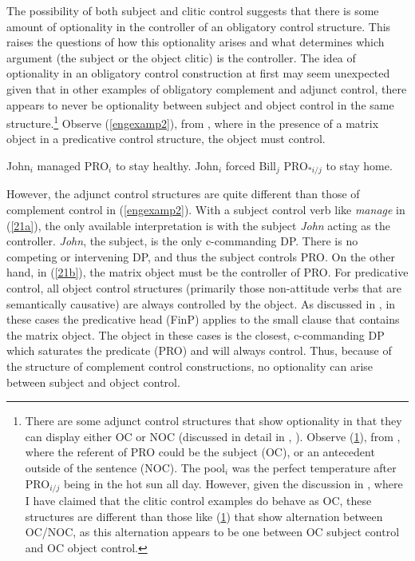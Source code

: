 \documentclass[output=paper,colorlinks,citecolor=brown]{langscibook}
\begin{document}
\largerpage[-2]
\noindent The possibility of both subject and clitic control suggests that there is some amount of optionality in the controller of an obligatory control structure. This raises the questions of how this optionality arises and what determines which argument (the subject or the object clitic) is the controller. The idea of optionality in an obligatory control construction at first may seem unexpected given that in other examples of obligatory complement and adjunct control, there appears to never be optionality between subject and object control in the same structure.\footnote{There are some adjunct control structures that show optionality in that they can display either OC or NOC (discussed in detail in \citealt{green2018adjunct}, \citeyear{green2019movement}). Observe (\ref{greenexamp}), from \citet{green2018adjunct}, where the referent of PRO could be the subject (OC), or an antecedent outside of the sentence (NOC).
\ea \label{greenexamp}
{
The pool$_i$ was the perfect temperature after PRO$_{i/j}$ being in the hot sun all day.
}
\z
However, given the discussion in , where I have claimed that the clitic control examples do behave as OC, these structures are different than those like (\ref{greenexamp}) that show alternation between OC/NOC, as this alternation appears to be one between OC subject control and OC object control.} Observe (\ref{engexamp2}), from \citet{landau2015}, where in the presence of a matrix object in a predicative control structure, the object must control.

\ea \label{engexamp2}
\ea \label{21a}
John$_i$ managed PRO$_i$ to stay healthy. 
\ex \label{21b}
John$_i$ forced Bill$_j$ PRO$_{*i/j}$ to stay home. 
\z
\z


However, the adjunct control structures are quite different than those of complement control in (\ref{engexamp2}). With a subject control verb like \textit{manage} in (\ref{21a}), the only available interpretation is with the subject \textit{John} acting as the controller. \textit{John}, the subject, is the only c-commanding DP. There is no competing or intervening DP, and thus the subject controls PRO. On the other hand, in (\ref{21b}), the matrix object must be the controller of PRO. For predicative control, all object control structures (primarily those non-attitude verbs that are semantically causative) are always controlled by the object. As discussed in , in these cases the predicative head (FinP) applies to the small clause that contains the matrix object. The object in these cases is the closest, c-commanding DP which saturates the predicate (PRO) and will always control. Thus, because of the structure of complement control constructions, no optionality can arise between subject and object control.
\end{document}
